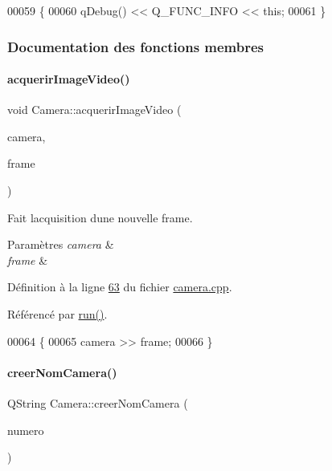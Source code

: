 \begin{DoxyCode}
00059 \{
00060     qDebug() << Q\_FUNC\_INFO << \textcolor{keyword}{this};
00061 \}
\end{DoxyCode}


\subsubsection{Documentation des fonctions membres}
\mbox{\label{class_camera_afbddcda62053404cbf06a4ba48c62732}} 
\paragraph{\texorpdfstring{acquerir\+Image\+Video()}{acquerirImageVideo()}}
{\footnotesize\ttfamily void Camera\+::acquerir\+Image\+Video (\begin{DoxyParamCaption}\item[{cv\+::\+Video\+Capture \&}]{camera,  }\item[{cv\+::\+Mat \&}]{frame }\end{DoxyParamCaption})\hspace{0.3cm}{\ttfamily [private]}}



Fait l\textquotesingle{}acquisition d\textquotesingle{}une nouvelle frame. 


\begin{DoxyParams}{Paramètres}
{\em camera} & \\
\hline
{\em frame} & \\
\hline
\end{DoxyParams}


Définition à la ligne \hyperlink{camera_8cpp_source_l00063}{63} du fichier \hyperlink{camera_8cpp_source}{camera.\+cpp}.



Référencé par \hyperlink{camera_8cpp_source_l00068}{run()}.


\begin{DoxyCode}
00064 \{
00065     camera >> frame;
00066 \}
\end{DoxyCode}
\mbox{\label{class_camera_a506d459df95042a03894afd5b781c2aa}} 
\paragraph{\texorpdfstring{creer\+Nom\+Camera()}{creerNomCamera()}}
{\footnotesize\ttfamily Q\+String Camera\+::creer\+Nom\+Camera (\begin{DoxyParamCaption}\item[{int}]{numero }\end{DoxyParamCaption})\hspace{0.3cm}{\ttfamily [static]}}



